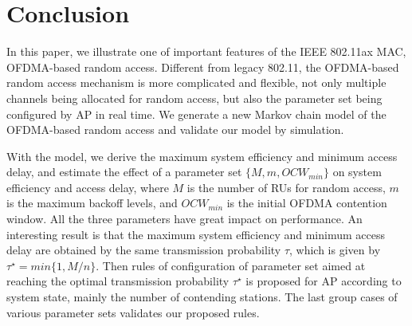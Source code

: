 \chapter{Conclusion}   \label{sec_conclu}
In this paper, we illustrate one of important features of the IEEE 802.11ax MAC, OFDMA-based random access. 
Different from legacy 802.11, the OFDMA-based random access mechanism is more complicated and flexible, not only multiple channels being allocated for random access, but also the parameter set being configured by AP in real time.
We generate a new Markov chain model of the OFDMA-based random access and validate our model by simulation. 

With the model, we derive the maximum system efficiency and minimum access delay, and estimate the effect of a parameter set $\lbrace M, m, OCW_{min} \rbrace$ on system efficiency and access delay, where $M$ is the number of RUs for random access, $m$ is the maximum backoff levels, and $OCW_{min}$ is the initial OFDMA contention window. 
All the three parameters have great impact on performance.
An interesting result is that the maximum system efficiency and minimum access delay are obtained by the same transmission probability $\tau$, which is given by $\tau^\star = min \lbrace 1,M/n\rbrace$. 
Then rules of configuration of parameter set aimed at reaching the optimal transmission probability $\tau^\star$ is proposed for AP according to system state, mainly the number of contending stations. 
The last group cases of various parameter sets validates our proposed rules.
